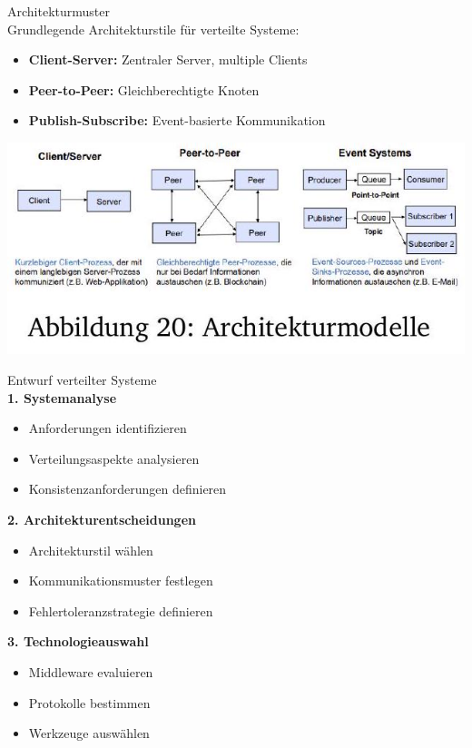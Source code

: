 \begin{concept}{Architekturmuster}\\
Grundlegende Architekturstile für verteilte Systeme:
\begin{itemize}
    \item \textbf{Client-Server:} Zentraler Server, multiple Clients
    \item \textbf{Peer-to-Peer:} Gleichberechtigte Knoten
    \item \textbf{Publish-Subscribe:} Event-basierte Kommunikation
\end{itemize}
\includegraphics[width=0.9\linewidth]{images/2024_12_29_0d1d7b5551ea1b4b41bdg-18}
\end{concept}

\begin{KR}{Entwurf verteilter Systeme}\\
\textbf{1. Systemanalyse}
\begin{itemize}
    \item Anforderungen identifizieren
    \item Verteilungsaspekte analysieren
    \item Konsistenzanforderungen definieren
\end{itemize}

\textbf{2. Architekturentscheidungen}
\begin{itemize}
    \item Architekturstil wählen
    \item Kommunikationsmuster festlegen
    \item Fehlertoleranzstrategie definieren
\end{itemize}

\textbf{3. Technologieauswahl}
\begin{itemize}
    \item Middleware evaluieren
    \item Protokolle bestimmen
    \item Werkzeuge auswählen
\end{itemize}
\end{KR}

